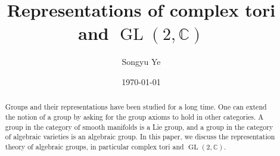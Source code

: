 \documentclass{amsart}
\DeclareMathOperator{\GL}{GL}
\newcommand{\C}{\mathbb{C}}
\numberwithin{equation}{section}
\theoremstyle{plain} %
\theoremstyle{definition}
\theoremstyle{remark}
\begin{document}
\title{Representations of complex tori and $\GL(2,\C)$}


\author{Songyu Ye} 

\address{}






\date{\today}

\begin{abstract}
	Groups and their representations have been studied for a long time. One can extend the
	notion of a group by asking for the group axioms to hold in other categories. A group in
	the category of smooth manifolds is a Lie group, and a group in the category of algebraic varieties
	is an algebraic group. In this paper, we discuss the representation theory of algebraic groups,
	in particular complex tori and $\GL(2,\C)$.
\end{abstract}


\maketitle



\end{document}
